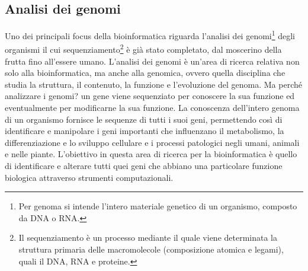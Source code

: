 \subsection{Analisi dei genomi}
Uno dei principali focus della bioinformatica riguarda l'analisi dei genomi\footnote{Per genoma si intende l'intero materiale genetico di un organismo, composto da DNA o RNA.} degli organismi il cui sequenziamento\footnote{Il sequenziamento è un processo mediante il quale viene determinata la struttura primaria delle macromolecole (composizione atomica e legami), quali il DNA, RNA e proteine.} è già stato completato, dal moscerino della frutta fino all'essere umano. L'analisi dei genomi è un'area di ricerca relativa non solo alla bioinformatica, ma anche alla genomica, ovvero quella disciplina che studia la struttura, il contenuto, la funzione e l'evoluzione del genoma.
Ma perché analizzare i genomi? un gene viene sequenziato per conoscere la sua funzione ed eventualmente per modificarne la sua funzione. La conoscenza dell'intero genoma di un organismo fornisce le sequenze di tutti i suoi geni, permettendo così di identificare e manipolare i geni importanti che influenzano il metabolismo, la differenziazione e lo sviluppo cellulare e i processi patologici negli umani, animali e nelle piante.
\newline
L'obiettivo in questa area di ricerca per la bioinformatica è quello di identificare e alterare tutti quei geni che abbiano una particolare funzione biologica attraverso strumenti computazionali.

